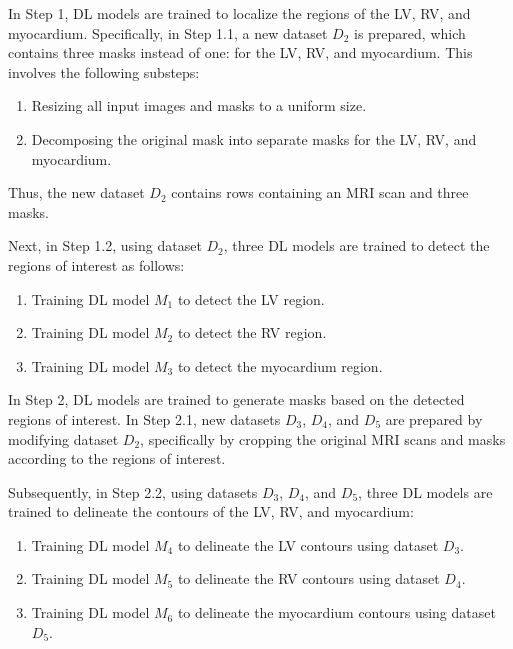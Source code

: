 \documentclass[fleqn,10pt]{wlscirep}
\begin{document}
In Step 1, DL models are trained to localize the regions of the LV, RV, and myocardium. Specifically, in Step 1.1, a new dataset \({D_2}\) is prepared, which contains three masks instead of one: for the LV, RV, and myocardium. This involves the following substeps:

\begin{enumerate}[label=Step 1.1.\arabic*:, leftmargin=6.5em]
    \item Resizing all input images and masks to a uniform size.
    \item Decomposing the original mask into separate masks for the LV, RV, and myocardium.
\end{enumerate}

Thus, the new dataset \({D_2}\) contains rows containing an MRI scan and three masks.

Next, in Step 1.2, using dataset \({D_2}\), three DL models are trained to detect the regions of interest as follows:

\begin{enumerate}[label=Step 1.2.\arabic*:, leftmargin=6.5em]
    \item Training DL model \({M_1}\) to detect the LV region.
    \item Training DL model \({M_2}\) to detect the RV region.
    \item Training DL model \({M_3}\) to detect the myocardium region.
\end{enumerate}

In Step 2, DL models are trained to generate masks based on the detected regions of interest. In Step 2.1, new datasets \({D_3}\), \({D_4}\), and \({D_5}\) are prepared by modifying dataset \({D_2}\), specifically by cropping the original MRI scans and masks according to the regions of interest.

Subsequently, in Step 2.2, using datasets \({D_3}\), \({D_4}\), and \({D_5}\), three DL models are trained to delineate the contours of the LV, RV, and myocardium:

\begin{enumerate}[label=Step 2.2.\arabic*:, leftmargin=6.5em]
    \item Training DL model \({M_4}\) to delineate the LV contours using dataset \({D_3}\).
    \item Training DL model \({M_5}\) to delineate the RV contours using dataset \({D_4}\).
    \item Training DL model \({M_6}\) to delineate the myocardium contours using dataset \({D_5}\).
\end{enumerate}
\end{document}
